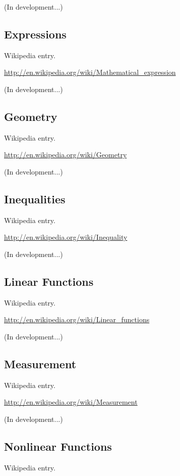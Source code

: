 \documentclass[12pt,twoside]{book}
\begin{document}
(In development...)

\subsection[Expressions]{Expressions}
Wikipedia entry.

\href{http://en.wikipedia.org/wiki/Mathematical_expression}{http://en.wikipedia.org/wiki/Mathematical\_expression}

(In development...)

\subsection[Geometry]{Geometry}
Wikipedia entry.

\href{http://en.wikipedia.org/wiki/Geometry}{http://en.wikipedia.org/wiki/Geometry}

(In development...)

\subsection[Inequalities]{Inequalities}
Wikipedia entry.

\href{http://en.wikipedia.org/wiki/Inequality}{http://en.wikipedia.org/wiki/Inequality}

(In development...)

\subsection[Linear Functions]{Linear Functions}
Wikipedia entry.

\href{http://en.wikipedia.org/wiki/Linear_functions}{http://en.wikipedia.org/wiki/Linear\_functions}

(In development...)

\subsection[Measurement]{Measurement}
Wikipedia entry.

\href{http://en.wikipedia.org/wiki/Measurement}{http://en.wikipedia.org/wiki/Measurement}

(In development...)

\subsection[Nonlinear Functions]{Nonlinear Functions}
Wikipedia entry.
\end{document}
